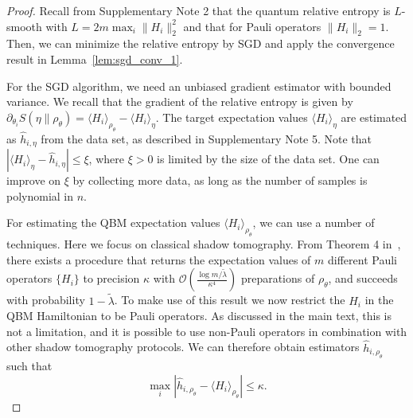 \documentclass[
    reprint,
    aps,
    prx,
    longbibliography
]{revtex4-2}
\begin{document}
\begin{proof}
Recall from Supplementary Note 2 that the quantum relative entropy is $L$-smooth with $L=2 m \max_i \| H_i \|_2^2$ and that for Pauli operators $\| H_i \|_2 = 1$. Then, we can minimize the relative entropy by SGD and apply the convergence result in Lemma~\ref{lem:sgd_conv_1}. 

For the SGD algorithm, we need an unbiased gradient estimator with bounded variance. We recall that the gradient of the relative entropy is given by $\partial_{\theta_i} S(\eta \|\rho_\theta)  = \langle H_i \rangle_{\rho_\theta} - \langle H_i\rangle_\eta$. The target expectation values $\langle H_i\rangle_\eta$ are estimated as $\hat{h}_{i,\eta}$ from the data set, as described in Supplementary Note 5. Note that $| \langle H_i\rangle_\eta - \hat{h}_{i,\eta} | \leq \xi$, where $\xi >0$ is limited by the size of the data set. One can improve on $\xi$ by collecting more data, as long as the number of samples is polynomial in $n$.

For estimating the QBM expectation values $\langle H_i \rangle_{\rho_\theta}$, we can use a number of techniques. Here we focus on classical shadow tomography. From Theorem 4 in~\cite{Huang_2021}, there exists a procedure that returns the expectation values of $m$ different Pauli operators $\{H_i\}$ to precision $\kappa$ with $\mathcal{O}(\frac{\log{m/\tilde{\lambda}}}{\kappa^4})$ preparations of $\rho_\theta$, and succeeds with probability $1-\tilde{\lambda}$. To make use of this result we now restrict the $H_i$ in the QBM Hamiltonian to be Pauli operators. As discussed in the main text, this is not a limitation, and it is possible to use non-Pauli operators in combination with other shadow tomography protocols. We can therefore obtain estimators $\hat{h}_{i, \rho_\theta}$ such that 
\begin{equation}
\label{eq:shadows}
    \max_i |\hat{h}_{i, \rho_\theta} - \langle H_i\rangle_{\rho_\theta}| \leq \kappa. 
\end{equation} 


\end{proof}
\end{document}
